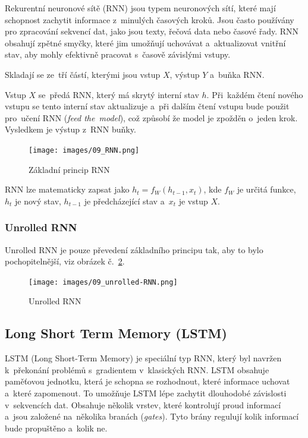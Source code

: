 Rekurentní neuronové sítě (RNN) jsou typem neuronových sítí, které mají schopnost zachytit informace z~minulých časových kroků. Jsou často používány pro zpracování sekvencí dat, jako jsou texty, řečová data nebo časové řady. RNN obsahují zpětné smyčky, které jim umožňují uchovávat a~aktualizovat vnitřní stav, aby mohly efektivně pracovat s~časově závislými vstupy.

Skladají se ze~tří částí, kterými jsou vstup $X$, výstup $Y$ a~buňka RNN.

Vstup $X$ se~předá RNN, který má skrytý interní stav $h$.
Při~každém čtení nového vstupu se tento interní stav aktualizuje a~při dalším čtení vstupu bude  použit pro~učení RNN (\emph{feed the~model}), což způsobí že model je zpožděn o~jeden krok.
Vysledkem je výstup z~RNN buňky.

\begin{figure}[h]
    \centering
    \texttt{[image: images/09\_RNN.png]}
    \caption{Základní princip RNN}
    \label{RNN}
\end{figure}

RNN lze matematicky zapsat jako $h_t = f_W(h_{t-1},x_t)$, kde $f_W$ je určitá funkce, $h_t$ je nový stav, $h_{t-1}$ je předcházející stav a~$x_t$ je vstup $X$.

\subsubsection{Unrolled RNN}

Unrolled RNN je pouze převedení základního principu tak, aby to bylo pochopitelnější, viz obrázek č.~\ref{unrolledRNN}.

\begin{figure}[h]
    \centering
    \texttt{[image: images/09\_unrolled-RNN.png]}
    \caption{Unrolled RNN}
    \label{unrolledRNN}
\end{figure}

\subsection{Long Short Term Memory (LSTM)}

LSTM (Long Short-Term Memory) je speciální typ RNN, který byl navržen k~překonání problémů s~gradientem v~klasických RNN. 
LSTM obsahuje paměťovou jednotku, která je schopna se rozhodnout, které informace uchovat a~které zapomenout. To umožňuje LSTM lépe 
zachytit dlouhodobé závislosti v~sekvencích dat.
Obsahuje několik vrstev, které kontrolují proud informací a~jsou založené na~několika branách (\emph{gates}).
Tyto brány regulují kolik informací bude propuštěno a~kolik ne.

